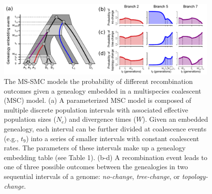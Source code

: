 \documentclass[11pt]{article}
\begin{document}


\begin{figure}
	\centering
	\includegraphics[width=0.99\textwidth]{figures/Fig1-embedding-and-probs-fill.pdf}
	\caption{
		The MS-SMC models the probability of different recombination outcomes 
		given a genealogy embedded in a multispecies coalescent (MSC) model.
		(a) A parameterized MSC model is composed of multiple discrete population
		intervals with associated effective population sizes ($N_e$) and divergence 
		times ($W$). Given an embedded genealogy, each interval can be further divided 
		at coalescence events (e.g., $t_9$) into a series of smaller intervals
		with constant coalescent rates. The parameters of these intervals make up a 
		genealogy embedding table (see Table 1).
		(b-d) A recombination event leads to one of three possible outcomes 
		between the genealogies in two sequential intervals of a genome: 
		\emph{no-change}, \emph{tree-change}, or \emph{topology-change}. 		
}
\end{figure}
\end{document}
